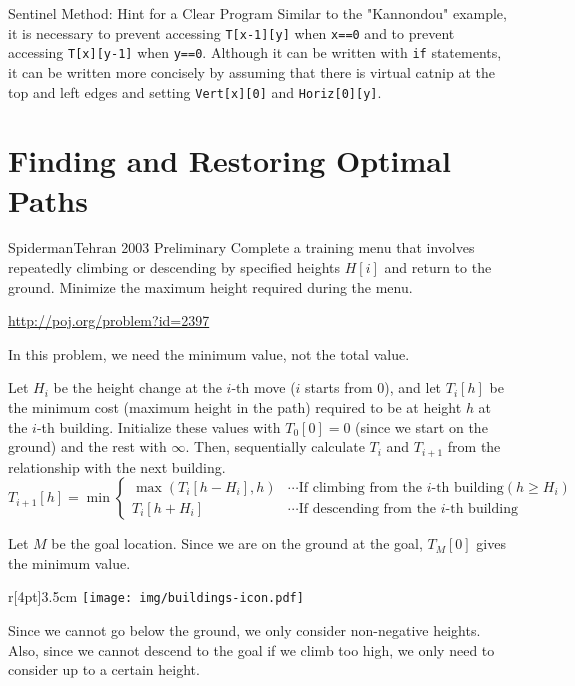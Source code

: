 \begin{tipsbox}{Sentinel Method: Hint for a Clear Program}
  Similar to the "Kannondou" example, it is necessary to prevent accessing \texttt{T[x-1][y]} when \texttt{x==0} and to prevent accessing \texttt{T[x][y-1]} when \texttt{y==0}.
Although it can be written with \texttt{if} statements, it can be written more concisely by assuming that there is virtual catnip at the top and left edges and setting \texttt{Vert[x][0]} and \texttt{Horiz[0][y]}.
\end{tipsbox}
\section{Finding and Restoring Optimal Paths}
\begin{pbox}{Spiderman}{Tehran 2003 Preliminary}
Complete a training menu that involves repeatedly climbing or descending by specified heights $H[i]$ and return to the ground. Minimize the maximum height required during the menu.

\url{http://poj.org/problem?id=2397}
\end{pbox}

In this problem, we need the minimum value, not the total value.

Let $H_i$ be the height change at the $i$-th move ($i$ starts from 0), and let $T_i[h]$ be the minimum cost (maximum height in the path) required to be at height $h$ at the $i$-th building.
Initialize these values with $T_0[0]=0$ (since we start on the ground) and the rest with $\infty$. Then, sequentially calculate $T_i$ and $T_{i+1}$ from the relationship with the next building.
$$T_{i+1}[h] = \min\left\{
\begin{array}{ll}
\max(T_i[h-H_i],h)  & \cdots \mbox{If climbing from the }i\mbox{-th building} (h\ge H_i)\\
 T_i[h+H_i]  & \cdots \mbox{If descending from the }i\mbox{-th building} 
\end{array}\right.
$$

Let $M$ be the goal location. Since we are on the ground at the goal, $T_M[0]$ gives the minimum value.

\begin{wrapfigure}[5]{r}[4pt]{3.5cm}
\texttt{[image: img/buildings-icon.pdf]}
\end{wrapfigure}       

Since we cannot go below the ground, we only consider non-negative heights. Also, since we cannot descend to the goal if we climb too high, we only need to consider up to a certain height.

